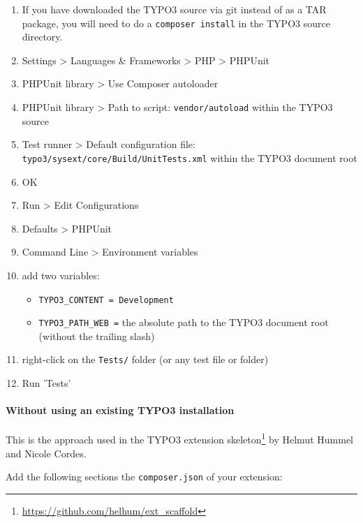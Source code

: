 \documentclass[a4paper,11pt,headsepline]{scrartcl}
\begin{document}
\begin{enumerate}
  \item If you have downloaded the TYPO3 source via git instead of as a TAR package, you will need to do a \texttt{composer install} in the TYPO3 source directory.
  \item Settings > Languages \& Frameworks > PHP > PHPUnit
  \item PHPUnit library > Use Composer autoloader
  \item PHPUnit library > Path to script: \texttt{vendor/autoload} within the TYPO3 source
  \item Test runner > Default configuration file: \texttt{typo3/sysext/core/Build/UnitTests.xml} within the TYPO3 document root
  \item OK
  \item Run > Edit Configurations
  \item Defaults > PHPUnit
  \item Command Line > Environment variables
  \item add two variables:
    \begin{itemize}
      \item \texttt{TYPO3\_CONTENT = Development}
      \item \texttt{TYPO3\_PATH\_WEB =} the absolute path to the TYPO3 document root (without the trailing slash)
    \end{itemize}
  \item right-click on the \texttt{Tests/} folder (or any test file or folder)
  \item Run 'Tests'
\end{enumerate}


\paragraph{Without using an existing TYPO3 installation}

This is the approach used in the TYPO3 extension skeleton\footnote{\url{https://github.com/helhum/ext_scaffold}} by Helmut Hummel and Nicole Cordes.

Add the following sections the \texttt{composer.json} of your extension:

\small
{}
\normalsize
\end{document}
